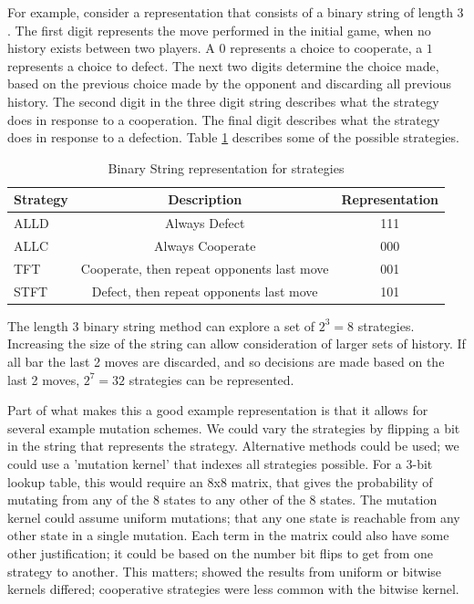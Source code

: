 \documentclass[a4paper,11pt,bcshonoursthesis,singlespace,twoside,thesisdraft,pdflatex]{cssethesis}
\begin{document}
For example, consider a representation that consists of a binary string of length 3 \citep{garcia:PLoSOne:2012}. 
The first digit represents the move performed in the initial game, when no history exists between two players. 
A $0$ represents a choice to cooperate, a $1$ represents a choice to defect. 
The next two digits determine the choice made, based on the previous choice made by the opponent and discarding all previous history. 
The second digit in the three digit string describes what the strategy does in response to a cooperation. 
The final digit describes what the strategy does in response to a defection. 
Table \ref{table:binaryStrategy} describes some of the possible strategies.

\begin{table}[h]
\centering
\captionsetup{justification=centering}
\begin{tabular}{|l|c|c|}
\hline
 Strategy & Description & Representation\\
\hline
ALLD & Always Defect & 111\\
\hline
ALLC & Always Cooperate & 000\\
\hline
TFT & Cooperate, then repeat opponents last move & 001\\
\hline
STFT & Defect, then repeat opponents last move & 101\\
\hline
\end{tabular}
\caption{Binary String representation for strategies}
\label{table:binaryStrategy}
\end{table}

The length 3 binary string method can explore a set of $2^3=8$ strategies. Increasing the size of the string can allow consideration of larger sets of history. 
If all bar the last 2 moves are discarded, and so decisions are made based on the last 2 moves, $2^7=32$ strategies can be represented. 

Part of what makes this a good example representation is that it allows for several example mutation schemes. 
We could vary the strategies by flipping a bit in the string that represents the strategy. 
Alternative methods could be used; we could use a 'mutation kernel' that indexes all strategies possible. 
For a 3-bit lookup table, this would require an 8x8 matrix, that gives the probability of mutating from any of the 8 states to any other of the 8 states. 
The mutation kernel could assume uniform mutations; that any one state is reachable from any other state in a single mutation. 
Each term in the matrix could also have some other justification; it could be based on the number bit flips to get from one strategy to another. 
This matters; \citet{garcia:PLoSOne:2012} showed the results from uniform or bitwise kernels differed; cooperative strategies were less common with the bitwise kernel. 
\end{document}
